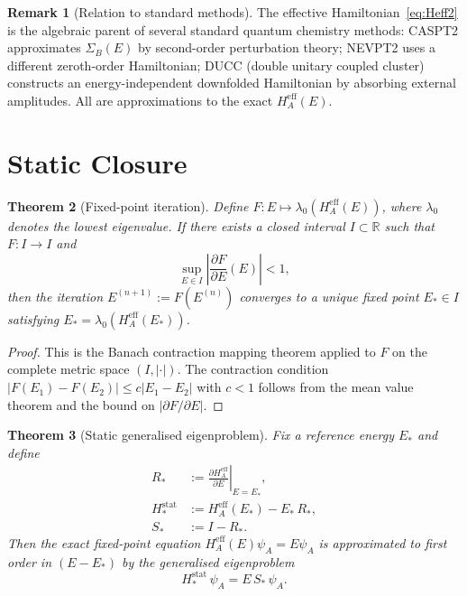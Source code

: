 \documentclass[12pt]{article}
\theoremstyle{plain}
\newtheorem{theorem}{Theorem}[section]
\theoremstyle{definition}
\newtheorem{remark}[theorem]{Remark}
\numberwithin{equation}{section}
\newcommand{\R}{\mathbb{R}}
\newcommand{\eff}{\mathrm{eff}}
\newcommand{\stat}{\mathrm{stat}}
\begin{document}
\begin{remark}[Relation to standard methods]
The effective Hamiltonian~\eqref{eq:Heff2} is the algebraic parent
of several standard quantum chemistry methods:
CASPT2 approximates $\Sigma_B(E)$ by second-order perturbation
theory;
NEVPT2 uses a different zeroth-order Hamiltonian;
DUCC (double unitary coupled cluster) constructs an
energy-independent downfolded Hamiltonian by absorbing external
amplitudes.
All are approximations to the exact $H_A^{\eff}(E)$.
\end{remark}


\section{Static Closure}\label{sec:static}

\begin{theorem}[Fixed-point iteration]\label{thm:fixedpoint}
Define $F:E\mapsto\lambda_0(H_A^{\eff}(E))$, where $\lambda_0$
denotes the lowest eigenvalue.  If there exists a closed interval
$I\subset\R$ such that $F:I\to I$ and
\begin{equation}
\sup_{E\in I}\left|\frac{\partial F}{\partial E}(E)\right| < 1,
\end{equation}
then the iteration $E^{(n+1)}:=F(E^{(n)})$ converges to a unique
fixed point $E_*\in I$ satisfying
$E_*=\lambda_0(H_A^{\eff}(E_*))$.
\end{theorem}

\begin{proof}
This is the Banach contraction mapping theorem applied to $F$ on
the complete metric space $(I,|\cdot|)$.  The contraction condition
$|F(E_1)-F(E_2)|\leq c|E_1-E_2|$ with $c<1$ follows from the
mean value theorem and the bound on $|\partial F/\partial E|$.
\end{proof}

\begin{theorem}[Static generalised eigenproblem]\label{thm:static}
Fix a reference energy $E_*$ and define
\begin{align}
R_* &:= \left.\frac{\partial H_A^{\eff}}{\partial E}\right|_{E=E_*},\\
H_*^{\stat} &:= H_A^{\eff}(E_*) - E_*\,R_*,\\
S_* &:= I - R_*.
\end{align}
Then the exact fixed-point equation
$H_A^{\eff}(E)\psi_A=E\psi_A$ is approximated to first order in
$(E-E_*)$ by the generalised eigenproblem
\begin{equation}\label{eq:geneig}
\boxed{H_*^{\stat}\,\psi_A = E\,S_*\,\psi_A.}
\end{equation}
\end{theorem}
\end{document}
